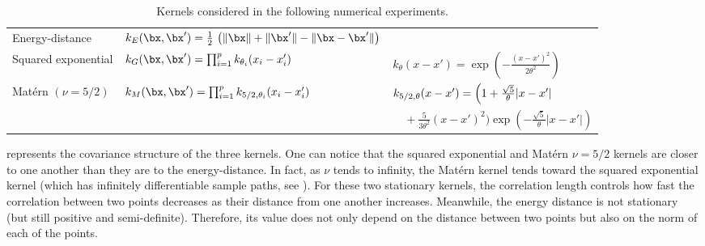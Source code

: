 \begin{table}[h] \caption{Kernels considered in the following numerical experiments.}
\begin{center}
\begin{tabular*}{\textwidth}{@{\extracolsep\fill}lll@{}}
\hline
Energy-distance & $k_E(\bx,\bx') = \frac12\, \left(\| \bx \| + \| \bx' \| - \| \bx-\bx' \|\right)$ & \\
Squared exponential & $k_G(\bx,\bx') = \prod_{i=1}^{p} k_{\theta_{i}}(x_{i}-x'_i)$ & $k_{\theta}(x-x') = \exp \left(- \frac{(x-x')^2}{2\theta^2}\right)$\\
Matérn $(\nu = 5/2)$ & $k_M(\bx,\bx') = \prod_{i=1}^{p} k_{5/2,\theta_{i}}(x_{i}-x'_i)$
 & $k_{5/2,\theta}(x-x') = \Bigl(1 + \frac{\sqrt{5}}{\theta} |x - x'|$ \\ 
 & & $\quad + \frac{5}{3 \theta^2} (x - x')^2 \Bigr) \exp \left( - \frac{\sqrt{5}}{\theta} |x - x'| \right)$ \\
\hline
\end{tabular*}
\label{tab:kernels}
\end{center}
\end{table}

 represents the covariance structure of the three kernels. 
One can notice that the squared exponential and Matérn $\nu = 5/2$ kernels are closer to one another than they are to the energy-distance. 
In fact, as $\nu$ tends to infinity, the Matérn kernel tends toward the squared exponential kernel (which has infinitely differentiable sample paths, see \cite{rasmussen_2006}). 
For these two stationary kernels, the correlation length controls how fast the correlation between two points decreases as their distance from one another increases. 
Meanwhile, the energy distance is not stationary (but still positive and semi-definite). 
Therefore, its value does not only depend on the distance between two points but also on the norm of each of the points.

